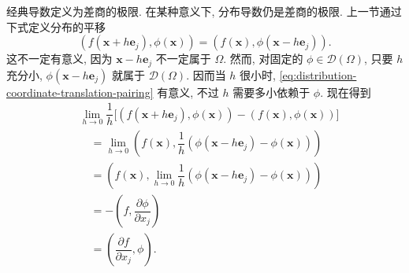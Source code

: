 \begin{Remark}
\label{rem:distribution-difference-quotients}
经典导数定义为差商的极限. 在某种意义下, 分布导数仍是差商的极限. 上一节通过下式定义分布的平移
\begin{equation}\label{eq:distribution-coordinate-translation-pairing}
(f(\bm{x}+h\bm{e}_j),\phi(\bm{x}))=(f(\bm{x}),\phi(\bm{x}-h\bm{e}_j)).
\end{equation}
这不一定有意义, 因为 $\bm{x}-h\bm{e}_j$ 不一定属于 $\Omega$. 然而, 对固定的 $\phi\in\mathcal{D}(\Omega)$, 只要 $h$ 充分小, $\phi(\bm{x}-h\bm{e}_j)$ 就属于 $\mathcal{D}(\Omega)$. 因而当 $h$ 很小时, \eqref{eq:distribution-coordinate-translation-pairing} 有意义, 不过 $h$ 需要多小依赖于 $\phi$. 现在得到\[
\begin{aligned}
&\lim_{h\to0}\dfrac1h\bigl[(f(\bm{x}+h\bm{e}_j),\phi(\bm{x}))-(f(\bm{x}),\phi(\bm{x}))\bigr]\\
&\quad=\lim_{h\to0}\left(f(\bm{x}),\dfrac1h(\phi(\bm{x}-h\bm{e}_j)-\phi(\bm{x}))\right)\\
&\quad=\left(f(\bm{x}),\lim_{h\to0}\dfrac1h(\phi(\bm{x}-h\bm{e}_j)-\phi(\bm{x}))\right)\\
&\quad=-\left(f,\dfrac{\partial\phi}{\partial x_j}\right)\\
&\quad=\left(\dfrac{\partial f}{\partial x_j},\phi\right).
\end{aligned}
\]
\end{Remark}
